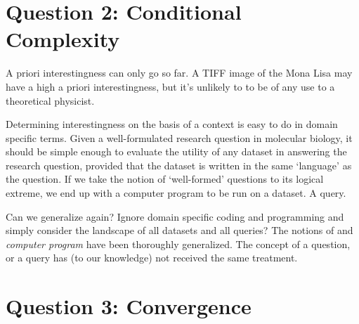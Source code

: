 \documentclass{article}
\begin{document}
\section{Question 2: Conditional Complexity}

A priori interestingness can only go so far. A TIFF image of the Mona Lisa
may have a high a priori interestingness, but it's unlikely to to be of any use
to a theoretical physicist. 

Determining interestingness on the basis of a context is easy to do in domain
specific terms. Given a well-formulated research question in molecular biology,
it should be simple enough to evaluate the utility of any dataset in answering
the research question, provided that the dataset is written in the same
`language' as the question. If we take the notion of `well-formed' questions to
its logical extreme, we end up with a computer program to be run on a dataset. A
query.

Can we generalize again? Ignore domain specific coding and programming and
simply consider the landscape of all datasets and all queries? The notions of
 and \emph{computer program} have been thoroughly generalized. The
concept of a question, or a query has (to our knowledge) not received the same
treatment.

\section{Question 3: Convergence}
\end{document}

